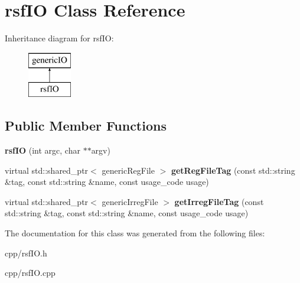 \hypertarget{classrsf_i_o}{}\section{rsf\+IO Class Reference}
\label{classrsf_i_o}
Inheritance diagram for rsf\+IO\+:\begin{figure}[H]
\begin{center}
\leavevmode
\includegraphics[height=2.000000cm]{classrsf_i_o}
\end{center}
\end{figure}
\subsection*{Public Member Functions}
\begin{DoxyCompactItemize}
\item 
\mbox{\label{classrsf_i_o_ad34a02826e4963c624aca9e03ab30aa0}} 
{\bfseries rsf\+IO} (int argc, char $\ast$$\ast$argv)
\item 
\mbox{\label{classrsf_i_o_a2bef9bf17782e92aa10f36a02f9f2235}} 
virtual std\+::shared\+\_\+ptr$<$ generic\+Reg\+File $>$ {\bfseries get\+Reg\+File\+Tag} (const std\+::string \&tag, const std\+::string \&name, const usage\+\_\+code usage)
\item 
\mbox{\label{classrsf_i_o_ac7ec67fe63579ba2bc93ed23cb81fdb5}} 
virtual std\+::shared\+\_\+ptr$<$ generic\+Irreg\+File $>$ {\bfseries get\+Irreg\+File\+Tag} (const std\+::string \&tag, const std\+::string \&name, const usage\+\_\+code usage)
\end{DoxyCompactItemize}


The documentation for this class was generated from the following files\+:\begin{DoxyCompactItemize}
\item 
cpp/rsf\+I\+O.\+h\item 
cpp/rsf\+I\+O.\+cpp\end{DoxyCompactItemize}
